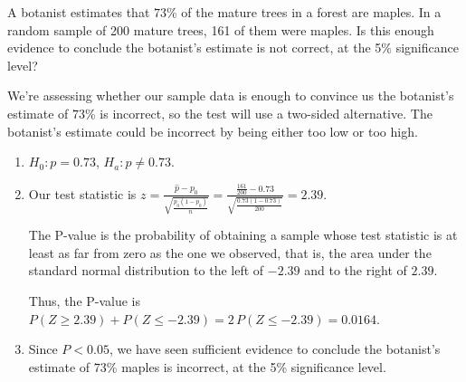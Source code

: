 \begin{example}
A botanist estimates that $73$\% of the mature trees in a forest are maples. In a random sample of 200 mature trees, 161 of them were maples. Is this enough evidence to conclude the botanist's estimate is not correct, at the 5\% significance level?

We're assessing whether our sample data is enough to convince us the botanist's estimate of $73$\% is incorrect, so the test will use a two-sided alternative. The botanist's estimate could be incorrect by being either too low or too high.

\begin{enumerate}[label=\textnormal{\Roman*}.]
\item $H_0: p = 0.73$, $H_a: p \neq 0.73$.

\item Our test statistic is $z = \frac{\widehat{p} - p_0}{\sqrt{\frac{p_0(1-p_0)}{n}}} = \frac{\frac{161}{200} - 0.73}{\sqrt{\frac{0.73(1-0.73)}{200}}} = 2.39$.

The P-value is the probability of obtaining a sample whose test statistic is at least as far from zero as the one we observed, that is, the area under the standard normal distribution to the left of $-2.39$ and to the right of $2.39$.
\begin{center}
\end{center}
Thus, the P-value is $P(Z \geq 2.39) + P(Z \leq -2.39) = 2\,P(Z \leq -2.39) = 0.0164$.

\item Since $P < 0.05$, we have seen sufficient evidence to conclude the botanist's estimate of $73$\% maples is incorrect, at the 5\% significance level.
\end{enumerate}
\end{example}

